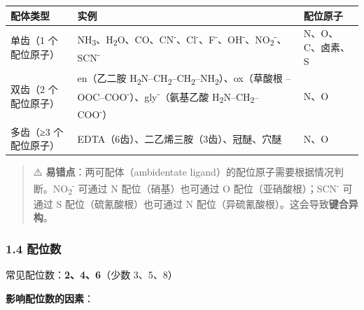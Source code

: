 \documentclass[a4paper,11pt]{ctexart}
\newcounter{none}
\begin{document}
{\def\LTcaptype{none} %
\begin{longtable}[]{@{}
  >{\raggedright\arraybackslash}p{}
  >{\raggedright\arraybackslash}p{}
  >{\centering\arraybackslash}p{}@{}}
\toprule\noalign{}
\begin{minipage}[b]{\linewidth}\raggedright
配体类型
\end{minipage} & \begin{minipage}[b]{\linewidth}\raggedright
实例
\end{minipage} & \begin{minipage}[b]{\linewidth}\centering
配位原子
\end{minipage} \\
\midrule\noalign{}
\endhead
\bottomrule\noalign{}
\endlastfoot
单齿（1 个配位原子） & NH\textsubscript{3}、H\textsubscript{2}O、CO、CN\textsuperscript{-}、Cl\textsuperscript{-}、F\textsuperscript{-}、OH\textsuperscript{-}、NO\textsubscript{2}\textsuperscript{-}、SCN\textsuperscript{-} & N、O、C、卤素、S \\
双齿（2 个配位原子） & en（乙二胺 H\textsubscript{2}N--CH\textsubscript{2}--CH\textsubscript{2}--NH\textsubscript{2}）、ox（草酸根 --OOC--COO\textsuperscript{-}）、gly\textsuperscript{-}（氨基乙酸 H\textsubscript{2}N--CH\textsubscript{2}--COO\textsuperscript{-}） & N、O \\
多齿（≥3 个配位原子） & EDTA（6齿）、二乙烯三胺（3齿）、冠醚、穴醚 & N、O \\
\end{longtable}
}

\begin{quote}
⚠️ \textbf{易错点}：两可配体（ambidentate ligand）的配位原子需要根据情况判断。NO\textsubscript{2}\textsuperscript{-} 可通过 N 配位（硝基）也可通过 O 配位（亚硝酸根）；SCN\textsuperscript{-} 可通过 S 配位（硫氰酸根）也可通过 N 配位（异硫氰酸根）。这会导致\textbf{键合异构}。
\end{quote}

\subsubsection{1.4 配位数}\label{ux914dux4f4dux6570}

常见配位数：\textbf{2、4、6}（少数 3、5、8）

\textbf{影响配位数的因素}：
\end{document}
